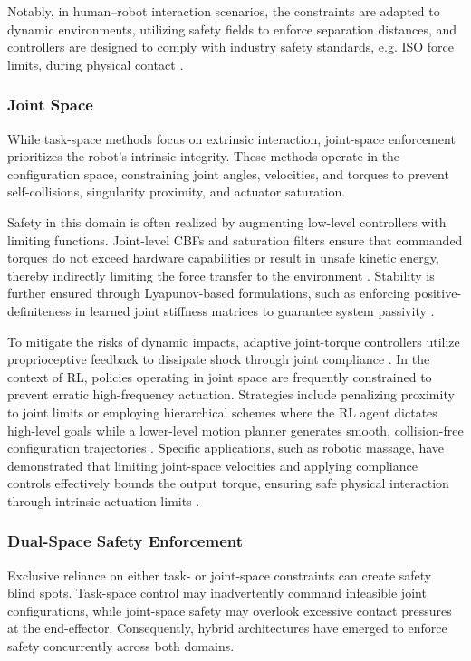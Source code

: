 \documentclass[Afour,sageh,times]{template/sagej}
\begin{document}
Notably, in human–robot interaction scenarios, the constraints are adapted to dynamic environments, utilizing safety fields to enforce separation distances, and controllers are designed to comply with industry safety standards, e.g. ISO force limits, during physical contact \cite{15, 51, 93}.

\subsubsection{Joint Space}
While task-space methods focus on extrinsic interaction, joint-space enforcement prioritizes the robot's intrinsic integrity. These methods operate in the configuration space, constraining joint angles, velocities, and torques to prevent self-collisions, singularity proximity, and actuator saturation. 

Safety in this domain is often realized by augmenting low-level controllers with limiting functions. Joint-level CBFs and saturation filters ensure that commanded torques do not exceed hardware capabilities or result in unsafe kinetic energy, thereby indirectly limiting the force transfer to the environment \cite{44}. Stability is further ensured through Lyapunov-based formulations, such as enforcing positive-definiteness in learned joint stiffness matrices to guarantee system passivity \cite{53, 59}.

To mitigate the risks of dynamic impacts, adaptive joint-torque controllers utilize proprioceptive feedback to dissipate shock through joint compliance \cite{60, 94}. In the context of RL, policies operating in joint space are frequently constrained to prevent erratic high-frequency actuation. Strategies include penalizing proximity to joint limits \cite{97} or employing hierarchical schemes where the RL agent dictates high-level goals while a lower-level motion planner generates smooth, collision-free configuration trajectories \cite{99}. Specific applications, such as robotic massage, have demonstrated that limiting joint-space velocities and applying compliance controls effectively bounds the output torque, ensuring safe physical interaction through intrinsic actuation limits \cite{46}.

\subsubsection{Dual-Space Safety Enforcement}
Exclusive reliance on either task- or joint-space constraints can create safety blind spots. Task-space control may inadvertently command infeasible joint configurations, while joint-space safety may overlook excessive contact pressures at the end-effector. Consequently, hybrid architectures have emerged to enforce safety concurrently across both domains.
\end{document}
